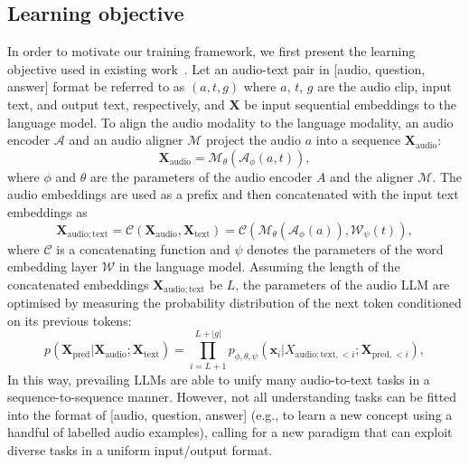 \subsection{Learning objective}  \label{subsec:learning_objective}
In order to motivate our training framework, we first present the learning objective used in existing work~\citep{deshmukh_pengi_2023}. Let an audio-text pair in [audio, question, answer] format be referred to as $(a, t, g)$ where $a$, $t$, $g$ are the audio clip, input text, and output text, respectively, and $\mathbf{X}$ be input sequential embeddings to the language model. To align the audio modality to the language modality, an audio encoder $\mathcal{A}$ and an audio aligner $\mathcal{M}$ project the audio $a$ into a sequence $\mathbf{X}_{\mathrm{audio}}$:
\begin{equation} \label{eqn.:extract_audio}
    \mathbf{X}_{\mathrm{audio}} = \mathcal{M}_{\theta}(\mathcal{A}_{\phi}(a, t)),
\end{equation}
where $\phi$ and $\theta$ are the parameters of the audio encoder $A$ and the aligner $\mathcal{M}$. The audio embeddings are used as a prefix and then concatenated with the input text embeddings as
\begin{equation} \label{eqn.:concat}
    \mathbf{X}_{\mathrm{audio;text}} =  \mathcal{C}(\mathbf{X}_{\mathrm{audio}}, \mathbf{X}_{\mathrm{text}}) = \mathcal{C}(\mathcal{M}_{\mathcal{\theta}}(\mathcal{A}_{\phi}(a)), \mathcal{W}_{\psi}(t)),
\end{equation}
where $\mathcal{C}$ is a concatenating function and $\psi$ denotes the parameters of the word embedding layer $\mathcal{W}$ in the language model. Assuming the length of the concatenated embeddings $\mathbf{X}_{\mathrm{audio;text}}$ be $L$, the parameters of the audio LLM are optimised by measuring the probability distribution of the next token conditioned on its previous tokens:
\begin{equation} \label{eqn.:next_token_pred}
    p(\mathbf{X}_{\mathrm{pred}}|\mathbf{X}_{\mathrm{audio}}; \mathbf{X}_{\mathrm{text}}) = \prod_{i=L+1}^{L+|g|}p_{\phi,\theta,\psi}(\mathbf{x}_i|X_{\mathrm{audio;text},<i}; \mathbf{X}_{\mathrm{pred},<i}),
\end{equation}
In this way, prevailing LLMs are able to unify many audio-to-text tasks in a sequence-to-sequence manner. However, not all understanding tasks can be fitted into the format of [audio, question, answer] (e.g., to learn a new concept using a handful of labelled audio examples), calling for a new paradigm that can exploit diverse tasks in a uniform input/output format.

